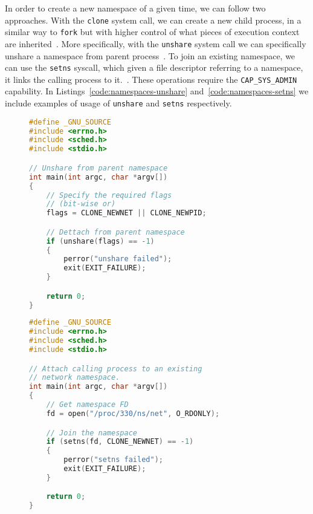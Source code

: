 In order to create a new namespace of a given time, we can follow two approaches.
With the \texttt{clone} system call, we can create a new child process, in a similar way to \texttt{fork} but with higher control of what pieces of execution context are inherited~\cite{clone-manual}.
More specifically, with the \texttt{unshare} system call we can specifically unshare a namespace from parent process~\cite{unshare-manual}.
To join an existing namespace, we can use the \texttt{setns} syscall, which given a file descriptor referring to a namespace, it links the calling process to it.~\cite{setns-manual}.
These operations require the \texttt{CAP\_SYS\_ADMIN} capability.
In Listings~\ref{code:namespaces-unshare} and~\ref{code:namespaces-setns} we include examples of usage of \texttt{unshare} and \texttt{setns} respectively.
\begin{figure}[h!]
    \begin{minipage}{.45\textwidth}
        \begin{lstlisting}[language=C,caption={Snippet to unshare the calling thread from a namespace using \texttt{unshare}.\label{code:namespaces-unshare}}]
#define _GNU_SOURCE
#include <errno.h>
#include <sched.h>
#include <stdio.h>

// Unshare from parent namespace
int main(int argc, char *argv[])
{
    // Specify the required flags
    // (bit-wise or)
    flags = CLONE_NEWNET || CLONE_NEWPID;

    // Dettach from parent namespace
    if (unshare(flags) == -1)
    {
        perror("unshare failed");
        exit(EXIT_FAILURE);        
    }

    return 0;
}
\end{lstlisting}
    \end{minipage} \hfill
    \begin{minipage}{.45\textwidth}
        \begin{lstlisting}[language=C,caption={Snippet to attach to an existing network namespace.\label{code:namespaces-setns}}]
#define _GNU_SOURCE
#include <errno.h>
#include <sched.h>
#include <stdio.h>

// Attach calling process to an existing
// network namespace.
int main(int argc, char *argv[])
{
    // Get namespace FD
    fd = open("/proc/330/ns/net", O_RDONLY);

    // Join the namespace
    if (setns(fd, CLONE_NEWNET) == -1)
    {
        perror("setns failed");
        exit(EXIT_FAILURE);        
    }

    return 0;
}
\end{lstlisting}
    \end{minipage}
\end{figure}

